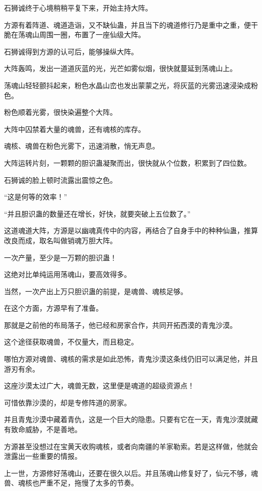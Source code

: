\begin{this_body}
石狮诚终于心境稍稍平复下来，开始主持大阵。

方源有着阵道、魂道造诣，又不缺仙蛊，并且当下的魂道修行乃是重中之重，便干脆在荡魂山周围一圈，布置了一座仙级大阵。

石狮诚得到方源的认可后，能够操纵大阵。

大阵轰鸣，发出一道道灰蓝的光，光芒如雾似烟，很快就蔓延到荡魂山上。

荡魂山轻轻颤抖起来，粉色水晶山峦也发出蒙蒙之光，将灰蓝的光雾迅速浸染成粉色。

粉色顺着光雾，很快染遍整个大阵。

大阵中囚禁着大量的魂兽，还有魂核的库存。

魂核、魂兽在粉色光雾下，迅速消散，悄无声息。

大阵运转片刻，一颗颗的胆识蛊凝聚而出，很快就从个位数，积累到了四位数。

石狮诚的脸上顿时流露出震惊之色。

“这是何等的效率！”

“并且胆识蛊的数量还在增长，好快，就要突破上五位数了。”

这道魂道大阵，方源是以幽魂真传中的内容，再结合了自身手中的种种仙蛊，推算改良而成，取名叫做销魂万胆大阵。

一次产量，至少是一万颗的胆识蛊！

这绝对比单纯运用荡魂山，要高效得多。

当然，一次产出上万只胆识蛊的前提，是魂兽、魂核足够。

在这个方面，方源早有了准备。

那就是之前他的布局落子，他已经和房家合作，共同开拓西漠的青鬼沙漠。

这个途径获取魂兽，不仅量大，而且稳定。

哪怕方源对魂兽、魂核的需求是如此恐怖，青鬼沙漠这条线仍旧可以满足他，并且游刃有余。

这座沙漠太过广大，魂兽无数，这里便是魂道的超级资源点！

可惜依靠沙漠的，却是专修阵道的房家。

并且青鬼沙漠中藏着青仇，这是一个巨大的隐患。只要有它在一天，青鬼沙漠就藏有致命威胁，不是善地。

方源甚至没想过在宝黄天收购魂核，或者向南疆的羊家勒索。若是这样做，他就会泄露出一些重要的情报。

上一世，方源修好荡魂山，还要在很久以后。并且荡魂山修复好了，仙元不够，魂兽、魂核也严重不足，拖慢了太多的节奏。


\end{this_body}
